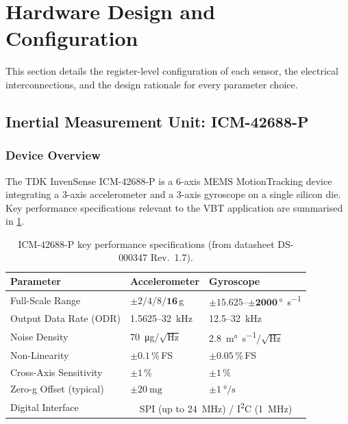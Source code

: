 \section{Hardware Design and Configuration}\label{sec:hw}

This section details the register-level configuration of each sensor, the electrical interconnections, and the design rationale for every parameter choice.


\subsection{Inertial Measurement Unit: ICM-42688-P}

\subsubsection{Device Overview}
The TDK InvenSense ICM-42688-P is a 6-axis MEMS MotionTracking device integrating a 3-axis accelerometer and a 3-axis gyroscope on a single silicon die.
Key performance specifications relevant to the VBT application are summarised in \cref{tab:imu_specs}.

\begin{table}[H]
  \centering
  \caption{ICM-42688-P key performance specifications (from datasheet DS-000347 Rev.~1.7).}
  \label{tab:imu_specs}
  \begin{tabular}{lll}
    \toprule
    \textbf{Parameter} & \textbf{Accelerometer} & \textbf{Gyroscope} \\
    \midrule
    Full-Scale Range            & $\pm 2/4/8/\mathbf{16}$\,\si{\g}         & $\pm 15.625$--$\mathbf{\pm 2000}$\,\si{\degree\per\second} \\
    Output Data Rate (ODR)      & \SI{1.5625}{}--\SI{32}{\kilo\hertz}       & \SI{12.5}{}--\SI{32}{\kilo\hertz} \\
    Noise Density               & \SI{70}{\micro\g}/$\sqrt{\text{Hz}}$        & \SI{2.8}{\milli\degree\per\second}/$\sqrt{\text{Hz}}$ \\
    Non-Linearity               & $\pm 0.1$\,\%\,FS                        & $\pm 0.05$\,\%\,FS \\
    Cross-Axis Sensitivity      & $\pm 1$\,\%                               & $\pm 1$\,\% \\
    Zero-g Offset (typical)     & $\pm\SI{20}{\milli\g}$                    & $\pm\SI{1}{\degree\per\second}$ \\
    Digital Interface            & \multicolumn{2}{c}{SPI (up to \SI{24}{\mega\hertz}) / I\textsuperscript{2}C (\SI{1}{\mega\hertz})} \\
    \bottomrule
  \end{tabular}
\end{table}

